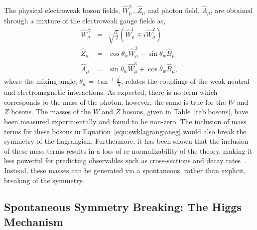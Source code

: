 The physical electroweak boson fields, $\hat{W}_{\mu}^{\pm}$, $\hat{Z}_{\mu}$ and photon field, 
$\hat{A}_{\mu}$, are obtained through a mixture of the electroweak gauge fields as,
\begin{eqnarray}
\hat{W}_{\mu}^{\pm} & = &  \sqrt{\frac{1}{2}} \left( \hat{W}_{\mu}^{1} \mp i \hat{W}_{\mu}^{2} \right) \nonumber \\
\hat{Z}_{\mu} &  = & \cos\theta_{w} \hat{W}_{\mu}^{3} - \sin\theta_{w} \hat{B}_{\mu} \nonumber \\
\hat{A}_{\mu} &  = & \sin\theta_{w} \hat{W}_{\mu}^{3} + \cos\theta_{w} \hat{B}_{\mu},
\label{eqn:ewkbosons}
\end{eqnarray}
where the mixing angle, $\theta_{w} = \tan^{-1}{\frac{g^{\prime}}{g}}$, relates
the couplings of the weak neutral and electromagnetic interactions.
As expected, there is no term which corresponds to the mass of the photon, however,
the same is true for the $W$ and $Z$ bosons. The masses of the $W$ and $Z$ bosons, 
given in Table~\ref{tab:bosons}, have been measured experimentally and found to be 
non-zero. The inclusion of mass terms for these bosons in Equation~\ref{eqn:ewklagrangianeg} 
would also break the symmetry of the Lagrangian. Furthermore, it has been shown that the inclusion
of these mass terms results in a loss of re-normalizability of the theory, making it  
less powerful for predicting observables such as cross-sections and decay rates~\citep{halzen}.
Instead, these masses can be generated via a spontaneous, rather than explicit, 
breaking of the symmetry.

\subsection{Spontaneous Symmetry Breaking: The Higgs Mechanism}

